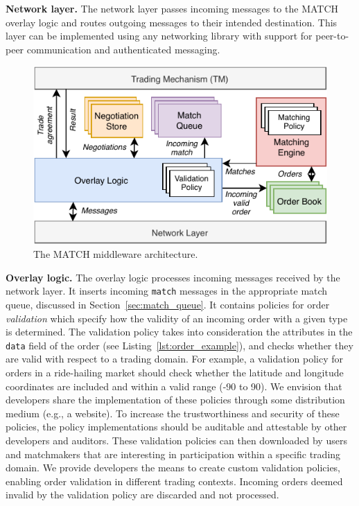 \textbf{Network layer.}
The network layer passes incoming messages to the MATCH overlay logic and routes outgoing messages to their intended destination.
This layer can be implemented using any networking library with support for peer-to-peer communication and authenticated messaging.

\begin{figure}[t]
	\centering
	\includegraphics[width=.9\linewidth]{match/assets/matching_architecture}
	\caption{The MATCH middleware architecture.}
	\label{fig:matching_architecture}
\end{figure}

\textbf{Overlay logic.}
The overlay logic processes incoming messages received by the network layer. %
It inserts incoming \texttt{match} messages in the appropriate match queue, discussed in Section~\ref{sec:match_queue}.
It contains policies for order \emph{validation} which specify how the validity of an incoming order with a given type is determined.
The validation policy takes into consideration the attributes in the \texttt{data} field of the order (see Listing~\ref{lst:order_example}), and checks whether they are valid with respect to a trading domain.
For example, a validation policy for orders in a ride-hailing market should check whether the latitude and longitude coordinates are included and within a valid range (-90 to 90).
We envision that developers share the implementation of these policies through some distribution medium (e.g., a website).
To increase the trustworthiness and security of these policies, the policy implementations should be auditable and attestable by other developers and auditors.
These validation policies can then downloaded by users and matchmakers that are interesting in participation within a specific trading domain.
We provide developers the means to create custom validation policies, enabling order validation in different trading contexts.
Incoming orders deemed invalid by the validation policy are discarded and not processed.

